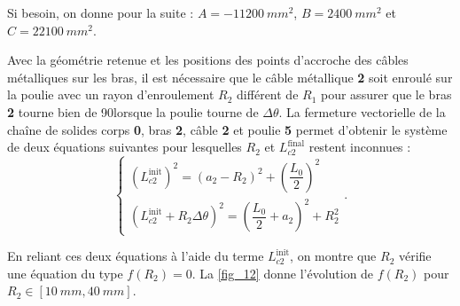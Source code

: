 \ifprof
\begin{corrige}
\end{corrige}
\else
\fi

\ifprof
\begin{corrige}
\end{corrige}
\else
\fi

Si besoin, on donne pour la suite : $A = -\SI{11200}{mm^2}$, 
$B = \SI{2400}{mm^2}$ et 
$C = \SI{22100}{mm^2}$.

\ifprof
\begin{corrige}
\end{corrige}
\else
\fi


Avec la géométrie retenue et les positions des points d’accroche des câbles métalliques sur
les bras, il est nécessaire que le câble métallique \textbf{2} soit enroulé sur la poulie avec un rayon
d’enroulement $R_2$ différent de $R_1$ pour assurer que le bras \textbf{2} tourne bien de 90\degres lorsque la
poulie tourne de $\Delta \theta$. La fermeture vectorielle de la chaîne de solides corps \textbf{0}, bras \textbf{2}, câble \textbf{2}
et poulie \textbf{5} permet d’obtenir le système de deux équations suivantes pour lesquelles $R_2$ et
$L_{c2}^{\text{final}}$ restent inconnues :
$$
\left\{
\begin{array}{l}
\left(L_{c2}^{\text{init}}\right)^2 = \left(a_2 -R_2\right)^2 + \left(\dfrac{L_0}{2}\right)^2 \\
\left(L_{c2}^{\text{init}} + R_2 \Delta \theta \right)^2 = \left(\dfrac{L_0}{2} + a_2\right)^2 + R_2^2
\end{array}
\right. .
$$


En reliant ces deux équations à l’aide du terme $L_{c2}^{\text{init}}$, on montre que $R_2$ vérifie une équation
du type $f(R_2) = 0$. La \autoref{fig_12} donne l’évolution de $f(R_2)$ pour $R_2 \in \left [\SI{10}{mm}, \SI{40}{ mm}\right]$.


